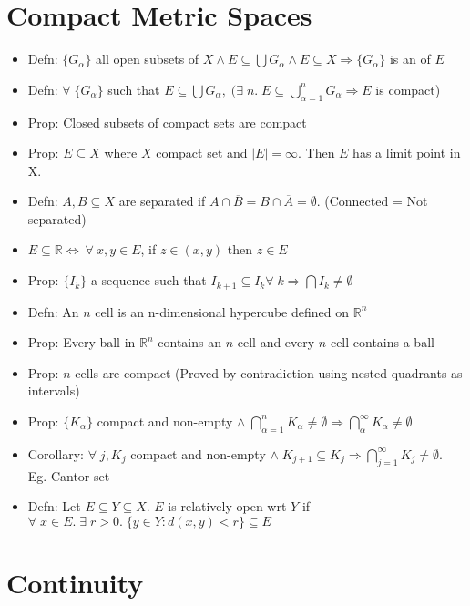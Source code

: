 \documentclass[11pt]{article}
\newcommand{\boxinate}[1]{\framebox[1.1\width]{#1}}
\begin{document}
\section{Compact Metric Spaces} %
\begin{itemize}
\item Defn: $\{G_{\alpha}\}$ all open subsets of $X \land E \subseteq \bigcup
  G_{\alpha} \land E \subseteq X \Rightarrow \{G_{\alpha}\}$ is an
  \boxinate{open cover} of $E$

\item Defn: $\forall\;\{G_{\alpha}\}$ such that $E \subseteq \bigcup G_{\alpha}
  ,\;(\exists\;n.\; E \subseteq \bigcup_{\alpha = 1}^n G_{\alpha} \Rightarrow
  E$ is compact)
\item Prop: Closed subsets of compact sets are compact
\item Prop: $E \subseteq X$ where $X$ compact set and $|E| = \infty$. Then $E$ has a limit point in X.
\item Defn: $A, B \subseteq X$ are separated if $A \cap \overline{B} = B \cap
  \overline{A} = \emptyset$. (Connected = Not separated)
\item $E \subseteq \mathbb{R} \iff ~\forall~x,y \in E$, if $z \in (x, y)$ then
  $z \in E$
\item Prop: $\{I_k\}$ a sequence such that $I_{k+1} \subseteq I_k \forall\;k
  \Rightarrow \bigcap I_k \neq \emptyset$
\item Defn: An $n$ cell is an n-dimensional hypercube defined on $\mathbb{R}^n$
\item Prop: Every ball in $\mathbb{R}^n$ contains an $n$ cell and every $n$
  cell contains a ball
\item Prop: $n$ cells are compact (Proved by contradiction using nested
  quadrants as intervals)
\item Prop: $\{K_{\alpha}\}$ compact and non-empty $\land\; \bigcap_{\alpha =
  1}^n K_{\alpha} \neq \emptyset \Rightarrow \bigcap_{\alpha}^{\infty}
  K_{\alpha} \neq \emptyset$
\item Corollary: $\forall\;j, K_j$ compact and non-empty $\land \;K_{j+1}
  \subseteq K_j \Rightarrow \bigcap_{j=1}^{\infty} K_j \neq
  \emptyset$. Eg. Cantor set
\item Defn: Let $E \subseteq Y \subseteq X$. $E$ is relatively open wrt $Y$ if
  $\forall\;x \in E.\;\exists\;r > 0.\;\{y \in Y: d(x, y) < r\} \subseteq E$
\end{itemize}

\section{Continuity}
\end{document}

